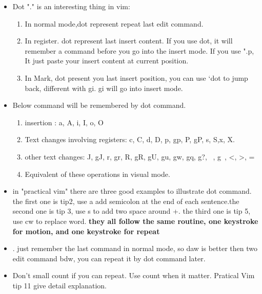 \documentclass[a4paper,12pt,twoside]{book}
\begin{document}
\begin{itemize}

\item Dot "." is an interesting thing in vim:

		\begin{enumerate}
			\item In normal mode,dot represent repeat last edit command.
						
			\item In register. dot represent last insert content. If you use dot, it will remember a command before you go into the insert mode. If you use ".p, It just paste your insert content at current position. 

			\item In Mark, dot present you last insert position, you can use `dot to jump back, different with gi. gi will go into insert mode.
		\end{enumerate}

\item Below command will be remembered by dot command.
		\begin{enumerate}
				\item insertion : a, A, i, I, o, O

				\item Text changes involving registers: c, C, d, D, p, gp, P, gP, s, S,x, X.

				\item other text changes: J, gJ, r, gr, R, gR, gU, gu, gw, gq, g?, ~, g~, <, >, =

				\item Equivalent of these operations in visual mode.

		\end{enumerate}

		\item in "practical vim" there are three good examples to illustrate dot command. the first one is tip2, use a add semicolon at the end of each sentence.the second one is tip 3, use s to add two space around +. the third one is tip 5, use cw to replace word. \textbf{they all follow the same routine, one keystroke for motion, and one keystroke for repeat}
				
		\item . just remember the last command in normal mode, so daw is better then two edit command bdw, you can repeat it by dot command later.

		\item  Don't small count if you can repeat. Use count when it matter. Pratical Vim tip 11 give detail explanation. 	

\end{itemize}
\end{document}
